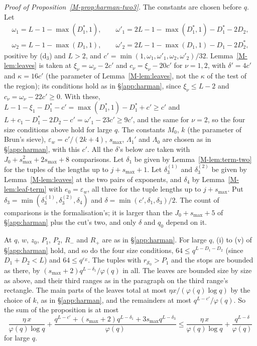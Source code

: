 \documentclass[11pt]{article}
\numberwithin{equation}{section}
\begin{document}
\emph{Proof of Proposition~\ref{M-prop:harman-two3}.} The constants are chosen before $q$. Let
\begin{gather*}
  \omega_1 = L - 1 - \max(D_1^*, 1), \qquad \omega'_1 = 2L - 1 - \max(D_1^*, 1) - D_1^* - 2D_2, \\
  \omega_2 = L - 1 - \max(D_1, 1), \qquad \omega'_2 = 2L - 1 - \max(D_1, 1) - D_1 - 2D_2^*,
\end{gather*}
positive by (d$_3$) and $L > 2$, and $c' = \min(1, \omega_1, \omega'_1, \omega_2, \omega'_2)/32$.
Lemma~\ref{M-lem:leaves} is taken at $\xi_\nu = \omega_\nu - 2c'$ and $c_\nu = \xi_\nu - 20c'$ for $\nu = 1, 2$, with
$\delta' = 4c'$ and $\kappa = 16c'$ (the parameter of Lemma~\ref{M-lem:leaves}, not the $\kappa$ of the test of the
region); its conditions hold as in \S\ref{app:harman}, since $\xi_\nu \le L - 2$ and $c_\nu = \omega_\nu - 22c' \ge
0$. With these, $L - 1 - \xi_1 - D_1^* - c' = \max(D_1^*, 1) - D_1^* + c' \ge c'$ and $L + c_1 - D_1^* - 2D_2 - c' =
\omega'_1 - 23c' \ge 9c'$, and the same for $\nu = 2$, so the four size conditions above hold for large $q$. The
constants $M_0$, $k$ (the parameter of Brun's sieve), $\varepsilon_w = c'/(2k + 4)$, $s_{\max}$, $\Lambda_1'$ and
$\Lambda_0$ are chosen as in \S\ref{app:harman}, with this $c'$. All the $\delta$'s below are taken with $J_0 +
s_{\max}^2 + 2s_{\max} + 8$ comparisons. Let $\delta_1$ be given by Lemma~\ref{M-lem:term-two} for the tuples of the
lengths up to $j + s_{\max} + 1$. Let $\delta_3^{(1)}$ and $\delta_3^{(2)}$ be given by Lemma~\ref{M-lem:leaves} at
the two pairs of exponents, and $\delta_4$ by Lemma~\ref{M-lem:leaf-term} with $e_0 = \varepsilon_w$, all three for
the tuple lengths up to $j + s_{\max}$. Put $\delta_3 = \min(\delta_3^{(1)}, \delta_3^{(2)}, \delta_4)$ and $\delta =
\min(c', \delta_1, \delta_3)/2$. The count of comparisons is the formalisation's; it is larger than the $J_0 +
s_{\max} + 5$ of \S\ref{app:harman} plus the cut's two, and only $\delta$ and $q_0$ depend on it.

At $q$, $w$, $z_0$, $P_1$, $P_2$, $R_-$ and $R_+$ are as in \S\ref{app:harman}. For large $q$, (i) to (v) of
\S\ref{app:harman} hold, and so do the four size conditions, $64 \le q^{L - D_1 - D_2}$ (since $D_1 + D_2 < L$) and
$64 \le q^{\varepsilon_E}$. The
tuples with $r_{\mathcal S_0} > P_1$ and the stops are bounded as there, by $(s_{\max} + 2)q^{L - \delta_1}/\varphi(q)$
in all. The leaves are bounded size by size as above, and their third ranges as in the paragraph on the third range's
rectangle. The main
parts of the leaves total at most $\eta x/(\varphi(q) \log q)$ by the choice of $k$, as in \S\ref{app:harman}, and the
remainders at most $q^{L - c'}/\varphi(q)$. So the sum of the proposition is at most
\[
  \frac{\eta \, x}{\varphi(q) \log q} + \frac{q^{L - c'} + (s_{\max} + 2) q^{L - \delta_1} + 3s_{\max} q^{L -
  \delta_3}}{\varphi(q)} \le \frac{\eta \, x}{\varphi(q) \log q} + \frac{q^{L - \delta}}{\varphi(q)}
\]
for large $q$.
\end{document}
